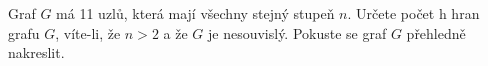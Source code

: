 Graf $G$ má 11 uzlů, která mají všechny stejný stupeň $n$. Určete počet h hran
grafu $G$, víte-li, že $n>2$ a že $G$ je nesouvislý. Pokuste se graf $G$
přehledně nakreslit.
